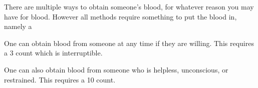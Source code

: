 \documentclass[green]{guildcamp4}
\begin{document}
\name{\gGotBlood{}}

There are multiple ways to obtain someone's blood, for whatever reason you may have for blood. 
However all methods require something to put the blood in, namely a \iTesttube{} 

One can obtain blood from someone at any time if they are willing. This requires a 3 count which is interruptible.

One can also obtain blood from someone who is helpless, unconscious, or restrained. This requires a 10 count.
\end{document}
